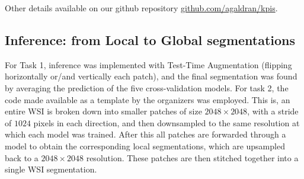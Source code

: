 Other details available on our github repository \href{https://github.com/agaldran/kpis}{\url{github.com/agaldran/kpis}}.

\subsection{Inference: from Local to Global segmentations}
For Task 1, inference was implemented with Test-Time Augmentation (flipping horizontally or/and vertically each patch), and the final segmentation was found by averaging the prediction of the five cross-validation models. 
For task 2, the code made available as a template by the organizers was employed. 
This is, an entire WSI is broken down into smaller patches of size $2048\times2048$, with a stride of $1024$ pixels in each direction, and then downsampled to the same resolution at which each model was trained. After this all patches are forwarded through a model to obtain the corresponding local segmentations, which are upsampled back to a $2048\times2048$ resolution.
These patches are then stitched together into a single WSI segmentation.

